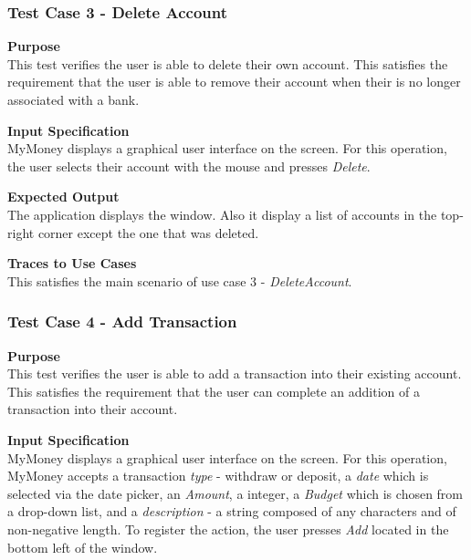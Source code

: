 \documentclass[12pt]{article}
\begin{document}
\clearpage %
\subsubsection{Test Case 3 - Delete Account} \label{TC-3}
\noindent
{\bf Purpose}\\
 This test verifies the user is able to delete their own account.
 This satisfies the requirement that the user is able to remove their account when their is no longer associated
 with a bank. 

 \noindent
 {\bf Input Specification}\\
 MyMoney displays a graphical user interface on the screen.
 For this operation, the user selects their account with the mouse and presses \textit{Delete}.
                            
 \noindent
 {\bf Expected Output}\\
 The application displays the window.
 Also it display a list of accounts in the top-right corner except the one that was deleted.

\noindent
{\bf Traces to Use Cases}\\
This satisfies the main scenario of use case 3 - \textit{DeleteAccount}.

\subsubsection{Test Case 4 - Add Transaction} \label{TC-4}

\noindent
{\bf Purpose}\\
This test verifies the user is able to add a transaction into their existing account.
This satisfies the requirement that the user can complete an addition of a transaction into their account.
                                        
\noindent
{\bf Input Specification}\\
MyMoney displays a graphical user interface on the screen.
For this operation, MyMoney accepts a transaction \textit{type} - withdraw or deposit, a \textit{date}
which is selected via the date picker, an \textit{Amount}, a integer, a \textit{Budget} which is chosen
from a drop-down list, and a \textit{description} - a string composed of any characters and
of non-negative length. To register the action, the user presses \textit{Add} located in the bottom left
of the window.                                          
\end{document}
